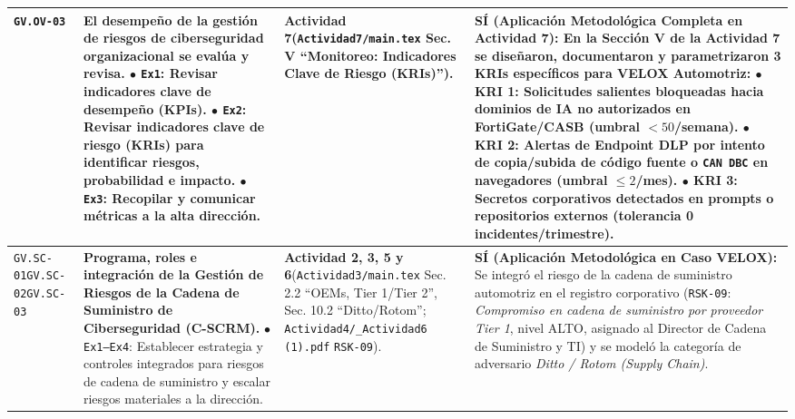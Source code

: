 \documentclass[letterpaper,11pt]{article}
\begin{document}
\begin{longtable}{|C{1.5cm}|L{5.3cm}|L{4.3cm}|L{5.8cm}|}
\texttt{GV.OV-03} &
\textbf{El desempeño de la gestión de riesgos de ciberseguridad organizacional se evalúa y revisa.}\newline
$\bullet$ \texttt{Ex1}: Revisar indicadores clave de desempeño (\textbf{KPIs}).\newline
$\bullet$ \texttt{Ex2}: Revisar indicadores clave de riesgo (\textbf{KRIs}) para identificar riesgos, probabilidad e impacto.\newline
$\bullet$ \texttt{Ex3}: Recopilar y comunicar métricas a la alta dirección. &
\textbf{Actividad 7}\newline (\texttt{Actividad7/main.tex} Sec. V ``Monitoreo: Indicadores Clave de Riesgo (KRIs)''). &
\textbf{SÍ (Aplicación Metodológica Completa en Actividad 7):}\newline
En la Sección V de la Actividad 7 se diseñaron, documentaron y parametrizaron \textbf{3 KRIs específicos} para VELOX Automotriz:\newline
$\bullet$ \textbf{KRI 1:} Solicitudes salientes bloqueadas hacia dominios de IA no autorizados en FortiGate/CASB (umbral $<50$/semana).\newline
$\bullet$ \textbf{KRI 2:} Alertas de Endpoint DLP por intento de copia/subida de código fuente o \texttt{CAN DBC} en navegadores (umbral $\le 2$/mes).\newline
$\bullet$ \textbf{KRI 3:} Secretos corporativos detectados en prompts o repositorios externos (tolerancia \textbf{0 incidentes/trimestre}). \\
\hline

\texttt{GV.SC-01}\newline \texttt{GV.SC-02}\newline \texttt{GV.SC-03} &
\textbf{Programa, roles e integración de la Gestión de Riesgos de la Cadena de Suministro de Ciberseguridad (C-SCRM).}\newline
$\bullet$ \texttt{Ex1--Ex4}: Establecer estrategia y controles integrados para riesgos de cadena de suministro y escalar riesgos materiales a la dirección. &
\textbf{Actividad 2, 3, 5 y 6}\newline (\texttt{Actividad3/main.tex} Sec. 2.2 ``OEMs, Tier 1/Tier 2'', Sec. 10.2 ``Ditto/Rotom''; \texttt{Actividad4/\_Actividad6 (1).pdf} \texttt{RSK-09}). &
\textbf{SÍ (Aplicación Metodológica en Caso VELOX):}\newline
Se integró el riesgo de la cadena de suministro automotriz en el registro corporativo (\texttt{RSK-09}: \textit{Compromiso en cadena de suministro por proveedor Tier 1}, nivel ALTO, asignado al Director de Cadena de Suministro y TI) y se modeló la categoría de adversario \textit{Ditto / Rotom (Supply Chain)}. \\
\hline


\end{longtable}
\end{document}
